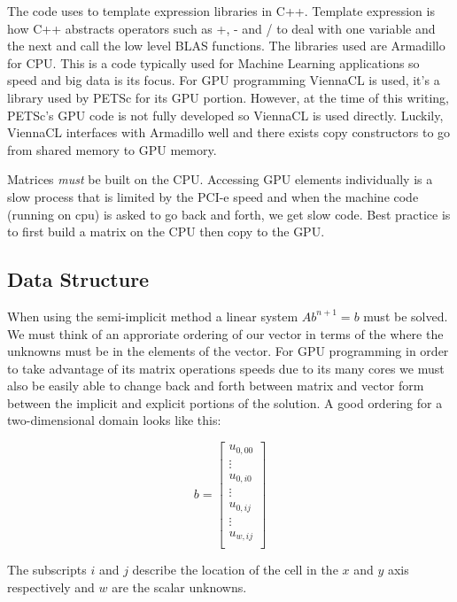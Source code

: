 \documentclass[12pt,upcase]{umlthesis}
\begin{document}
The code uses to template expression libraries in C++. Template expression is how C++ abstracts operators such as +, - and / to deal with one variable and the next and call the low level BLAS functions. The libraries used are Armadillo for CPU\@. This is a code typically used for Machine Learning applications so speed and big data is its focus. For GPU programming ViennaCL is used, it's a library used by PETSc for its GPU portion. However, at the time of this writing, PETSc's GPU code is not fully developed so ViennaCL is used directly. Luckily, ViennaCL interfaces with Armadillo well and there exists copy constructors to go from shared memory to GPU memory.

Matrices {\it must\/} be built on the CPU\@. Accessing GPU elements individually is a slow process that is limited by the PCI-e speed and when the machine code (running on cpu) is asked to go back and forth, we get slow code. Best practice is to first build a matrix on the CPU then copy to the GPU\@.

\subsection{Data Structure}\label{sec:datastructure}

When using the semi-implicit method a linear system $Ab^{n+1}=b$ must be solved. We must think of an approriate ordering of our vector in terms of the where the unknowns must be in the elements of the vector. For GPU programming in order to take advantage of its matrix operations speeds due to its many cores we must also be easily able to change back and forth between matrix and vector form between the implicit and explicit portions of the solution. A good ordering for a two-dimensional domain looks like this:

\begin{equation}
	b =
\begin{bmatrix}
	u_{0,00} \\
	\vdots \\
	u_{0,i0} \\
	\vdots \\
	u_{0,ij} \\
	\vdots \\
	u_{w,ij} \\
\end{bmatrix}
\end{equation}

The subscripts $i$ and $j$ describe the location of the cell in the $x$ and $y$ axis respectively and $w$ are the scalar unknowns.
\end{document}
